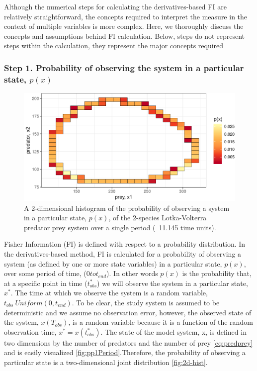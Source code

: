 \documentclass[12pt,twoside,openany]{reedthesis}
\begin{document}
Although the numerical steps for calculating the derivatives-based FI are relatively straightforward, the concepts required to interpret the measure in the context of multiple variables is more complex. Here, we thoroughly discuss the concepts and assumptions behind FI calculation. Below, steps do not represent steps within the calculation, they represent the major concepts required

\hypertarget{step-1.-probability-of-observing-the-system-in-a-particular-state-px}{%
\subsubsection{\texorpdfstring{\textbf{Step 1. Probability of observing the system in a particular state, \(p(x)\)}}{Step 1. Probability of observing the system in a particular state, p(x)}}\label{step-1.-probability-of-observing-the-system-in-a-particular-state-px}}
\begin{figure}

{\centering \includegraphics[width=0.85\linewidth]{_myDissertation_files/figure-latex/2D-hist-1} 

}

\caption{A 2-dimensional histogram of the probability of observing a system in a particular state, $p(x)$, of the 2-species Lotka-Volterra predator prey system over a single period (~11.145 time units).}\label{fig:2D-hist}
\end{figure}
Fisher Information (FI) is defined with respect to a probability distribution. In the derivatives-based method, FI is calculated for a probability of observing a system (as defined by one or more state variables) in a particular state, \(p(x)\), over some period of time, (\(0 to t_{end}\)). In other words \(p(x)\) is the probability that, at a specific point in time (\(t_{obs}^*\)) we will observe the system in a particular state, \(x^*\). The time at which we observe the system is a random variable, \(t_{obs} ~ Uniform(0,t_{end})\). To be clear, the study system is assumed to be deterministic and we assume no observation error, however, the observed state of the system, \(x(T_{obs})\), is a random variable because it is a function of the random observation time, \(x^*= x(t_{obs}^*)\). The state of the model system, x, is defined in two dimensions by the number of predators and the number of prey \eqref{eq:predprey} and is easily visualized \ref{fig:pp1Period}.Therefore, the probability of observing a particular state is a two-dimensional joint distribution \ref{fig:2d-hist}.
\end{document}
